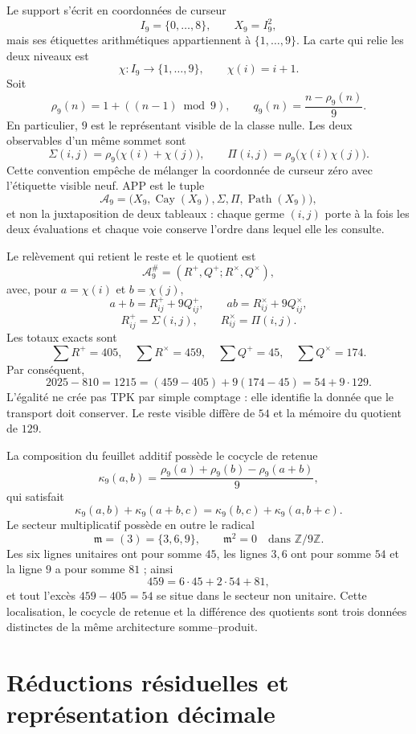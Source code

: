 Le support s'écrit en coordonnées de curseur
\[
 I_9=\{0,\ldots,8\},\qquad X_9=I_9^2,
\]
mais ses étiquettes arithmétiques appartiennent à \(\{1,\ldots,9\}\). La carte
qui relie les deux niveaux est
\[
 \chi:I_9\longrightarrow\{1,\ldots,9\},\qquad \chi(i)=i+1.
\]
Soit
\[
 \rho_9(n)=1+((n-1)\bmod9),\qquad
 q_9(n)=\frac{n-\rho_9(n)}9.
\]
En particulier, \(9\) est le représentant visible de la classe nulle. Les deux
observables d'un même sommet sont
\[
 \Sigma(i,j)=\rho_9\bigl(\chi(i)+\chi(j)\bigr),\qquad
 \Pi(i,j)=\rho_9\bigl(\chi(i)\chi(j)\bigr).
\]
Cette convention empêche de mélanger la coordonnée de curseur zéro avec l'étiquette
visible neuf. APP est le tuple
\[
 \mathcal A_9=
 \bigl(X_9,\operatorname{Cay}(X_9),\Sigma,\Pi,
       \operatorname{Path}(X_9)\bigr),
\]
et non la juxtaposition de deux tableaux : chaque germe \((i,j)\) porte à la fois
les deux évaluations et chaque voie conserve l'ordre dans lequel elle les consulte.

Le relèvement qui retient le reste et le quotient est
\[
 \mathcal A_9^\#=(R^+,Q^+;R^\times,Q^\times),
\]
avec, pour \(a=\chi(i)\) et \(b=\chi(j)\),
\[
 a+b=R^+_{ij}+9Q^+_{ij},\qquad
 ab=R^\times_{ij}+9Q^\times_{ij},
\]
\[
 R^+_{ij}=\Sigma(i,j),\qquad R^\times_{ij}=\Pi(i,j).
\]
Les totaux exacts sont
\[
 \sum R^+=405,\quad \sum R^\times=459,\quad
 \sum Q^+=45,\quad \sum Q^\times=174.
\]
Par conséquent,
\[
 2025-810=1215=(459-405)+9(174-45)=54+9\cdot129.
\]
L'égalité ne crée pas TPK par simple comptage : elle identifie la donnée que le
transport doit conserver. Le reste visible diffère de \(54\) et la mémoire
du quotient de \(129\).

La composition du feuillet additif possède le cocycle de retenue
\[
 \kappa_9(a,b)=
 \frac{\rho_9(a)+\rho_9(b)-\rho_9(a+b)}9,
\]
qui satisfait
\[
 \kappa_9(a,b)+\kappa_9(a+b,c)
 =\kappa_9(b,c)+\kappa_9(a,b+c).
\]
Le secteur multiplicatif possède en outre le radical
\[
 \mathfrak m=(3)=\{3,6,9\},\qquad \mathfrak m^2=0
 \quad\text{dans }\mathbb Z/9\mathbb Z.
\]
Les six lignes unitaires ont pour somme \(45\), les lignes \(3,6\) ont pour somme \(54\) et
la ligne \(9\) a pour somme \(81\) ; ainsi
\[
 459=6\cdot45+2\cdot54+81,
\]
et tout l'excès \(459-405=54\) se situe dans le secteur non unitaire. Cette
localisation, le cocycle de retenue et la différence des quotients sont trois
données distinctes de la même architecture somme--produit.
\fi

\section{Réductions résiduelles et représentation décimale}

